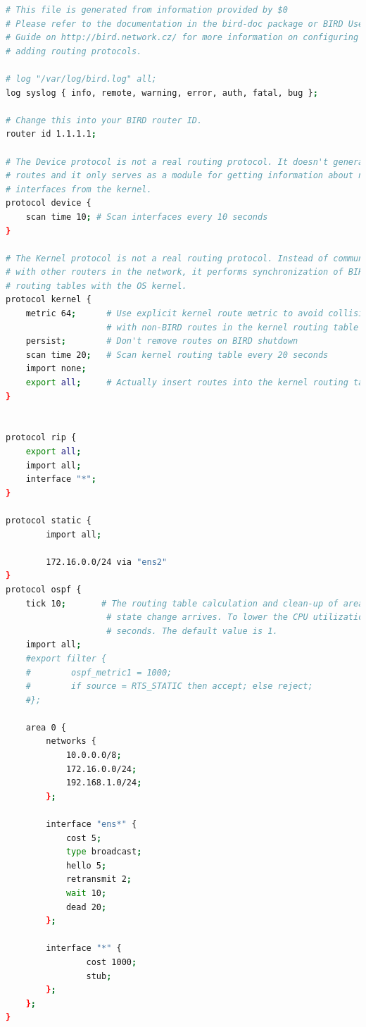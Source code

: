 \documentclass[11pt,titlepage]{article}
\begin{document}
\begin{lstlisting}[language=bash,caption={/etc/bird/bird.conf on R1}]
# This file is generated from information provided by $0
# Please refer to the documentation in the bird-doc package or BIRD User's
# Guide on http://bird.network.cz/ for more information on configuring BIRD and
# adding routing protocols.

# log "/var/log/bird.log" all;
log syslog { info, remote, warning, error, auth, fatal, bug };

# Change this into your BIRD router ID.
router id 1.1.1.1;

# The Device protocol is not a real routing protocol. It doesn't generate any
# routes and it only serves as a module for getting information about network
# interfaces from the kernel.
protocol device {
    scan time 10; # Scan interfaces every 10 seconds
}

# The Kernel protocol is not a real routing protocol. Instead of communicating
# with other routers in the network, it performs synchronization of BIRD's
# routing tables with the OS kernel.
protocol kernel {
    metric 64;      # Use explicit kernel route metric to avoid collisions
                    # with non-BIRD routes in the kernel routing table
    persist;        # Don't remove routes on BIRD shutdown
    scan time 20;   # Scan kernel routing table every 20 seconds
    import none;
    export all;     # Actually insert routes into the kernel routing table
}


protocol rip {
    export all;
    import all;
    interface "*";
}

protocol static {
        import all;
        
        172.16.0.0/24 via "ens2"
}
protocol ospf {
    tick 10;       # The routing table calculation and clean-up of areas' databases is not performed when a single link
                    # state change arrives. To lower the CPU utilization, it's processed later at periodical intervals of num
                    # seconds. The default value is 1.
    import all;
    #export filter {
    #        ospf_metric1 = 1000;
    #        if source = RTS_STATIC then accept; else reject;
    #};

    area 0 {
        networks {
            10.0.0.0/8;
            172.16.0.0/24;
            192.168.1.0/24;
        };
        
        interface "ens*" {
            cost 5;
            type broadcast;
            hello 5; 
            retransmit 2; 
            wait 10; 
            dead 20;
        };

        interface "*" {
                cost 1000;
                stub;
        };
    };
}


\end{lstlisting}
\end{document}
